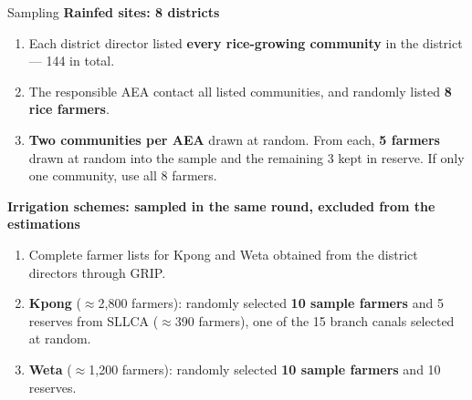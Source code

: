 \documentclass[aspectratio=169]{beamer}
\begin{document}
\begin{frame}{Sampling}
	\footnotesize
	\textbf{Rainfed sites: 8 districts}
	\begin{enumerate}
		\item Each district director listed \textbf{every rice-growing community} in the district --- 144 in total.
		\item The responsible AEA contact all listed communities, and randomly listed \textbf{8 rice farmers}.
		\item \textbf{Two communities per AEA} drawn at random. From each, \textbf{5 farmers} drawn at random into the sample and the remaining 3 kept in reserve. If only one community, use all 8 farmers.
	\end{enumerate}

	\vspace{0.18cm}
	\textbf{Irrigation schemes: sampled in the same round, excluded from the estimations}
	\begin{enumerate}
		\item Complete farmer lists for Kpong and Weta obtained from the district directors
		      through GRIP.
		\item \textbf{Kpong} ($\approx$2{,}800 farmers): randomly selected \textbf{10 sample farmers} and 5 reserves from SLLCA ($\approx$390 farmers), one of the 15 branch canals selected at random.
		\item \textbf{Weta} ($\approx$1{,}200 farmers): randomly selected \textbf{10 sample farmers} and
		      10 reserves.
	\end{enumerate}
\end{frame}
\end{document}
